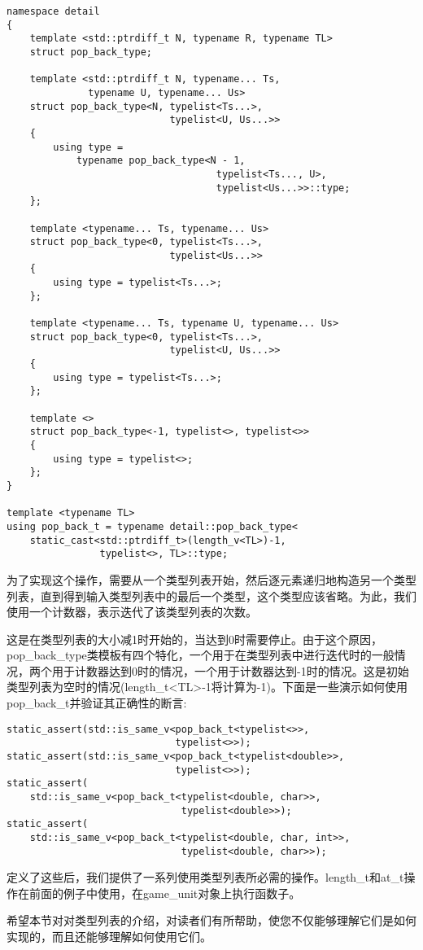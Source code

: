 \begin{lstlisting}[style=styleCXX]
namespace detail
{
	template <std::ptrdiff_t N, typename R, typename TL>
	struct pop_back_type;
	
	template <std::ptrdiff_t N, typename... Ts,
			  typename U, typename... Us>
	struct pop_back_type<N, typelist<Ts...>,
							typelist<U, Us...>>
	{
		using type =
			typename pop_back_type<N - 1,
									typelist<Ts..., U>,
									typelist<Us...>>::type;
	};

	template <typename... Ts, typename... Us>
	struct pop_back_type<0, typelist<Ts...>,
							typelist<Us...>>
	{
		using type = typelist<Ts...>;
	};

	template <typename... Ts, typename U, typename... Us>
	struct pop_back_type<0, typelist<Ts...>,
							typelist<U, Us...>>
	{
		using type = typelist<Ts...>;
	};

	template <>
	struct pop_back_type<-1, typelist<>, typelist<>>
	{
		using type = typelist<>;
	};
}

template <typename TL>
using pop_back_t = typename detail::pop_back_type<
	static_cast<std::ptrdiff_t>(length_v<TL>)-1,
				typelist<>, TL>::type;
\end{lstlisting}

为了实现这个操作，需要从一个类型列表开始，然后逐元素递归地构造另一个类型列表，直到得到输入类型列表中的最后一个类型，这个类型应该省略。为此，我们使用一个计数器，表示迭代了该类型列表的次数。

这是在类型列表的大小减1时开始的，当达到0时需要停止。由于这个原因，pop\_back\_type类模板有四个特化，一个用于在类型列表中进行迭代时的一般情况，两个用于计数器达到0时的情况，一个用于计数器达到-1时的情况。这是初始类型列表为空时的情况(length\_t<TL>-1将计算为-1)。下面是一些演示如何使用pop\_back\_t并验证其正确性的断言:

\begin{lstlisting}[style=styleCXX]
static_assert(std::is_same_v<pop_back_t<typelist<>>,
							 typelist<>>);
static_assert(std::is_same_v<pop_back_t<typelist<double>>,
							 typelist<>>);
static_assert(
	std::is_same_v<pop_back_t<typelist<double, char>>,
							  typelist<double>>);
static_assert(
	std::is_same_v<pop_back_t<typelist<double, char, int>>,
							  typelist<double, char>>);
\end{lstlisting}

定义了这些后，我们提供了一系列使用类型列表所必需的操作。length\_t和at\_t操作在前面的例子中使用，在game\_unit对象上执行函数子。

希望本节对对类型列表的介绍，对读者们有所帮助，使您不仅能够理解它们是如何实现的，而且还能够理解如何使用它们。



















